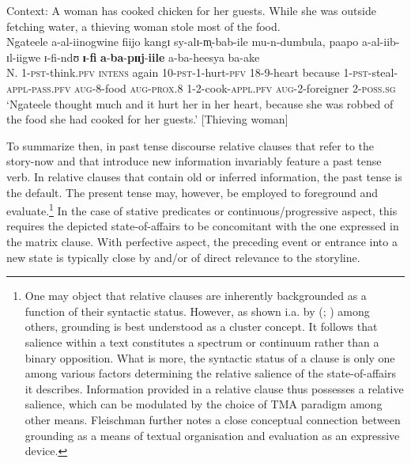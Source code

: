 \begin{exe}
\ex Context: A woman has cooked chicken for her guests. While she was outside fetching water, a thieving woman stole most of the food.\\
\gll Ngateele a-al-iinogwine fiijo kangɪ sy-alɪ-m̩-bab-ile mu-n-dumbula, paapo a-al-iib-ɪl-iigwe ɪ-fi-ndʊ \textbf{ɪ}-\textbf{fi} \textbf{a}-\textbf{ba}-\textbf{pɪɪj}-\textbf{iile} a-ba-heesya ba-ake\\
N. 1-\textsc{pst}-think.\textsc{pfv} \textsc{intens} again 10-\textsc{pst}-1-hurt-\textsc{pfv} 18-9-heart because 1-\textsc{pst}-steal-\textsc{appl}-\textsc{pass.pfv} \textsc{aug}-8-food \textsc{aug}-\textsc{prox.8} 1-2-cook-\textsc{appl.pfv} \textsc{aug}-2-foreigner 2-\textsc{poss.sg}\\
\glt \lq Ngateele thought much and it hurt her in her heart, because she was robbed of the food she had cooked for her guests.' [Thieving woman]
\end{exe}

To summarize then, in past tense  discourse relative clauses that refer to the story-now and that introduce new information invariably feature a past tense verb. In relative clauses that contain old or inferred information, the past tense is the default. The present tense may, however, be 
employed to foreground and evaluate.\footnote{One may object that relative clauses are inherently backgrounded as a function of their syntactic status. However, as shown i.a. by \citeauthor{FleischmanS1985} (\citeyear{FleischmanS1985}; \citeyear[ch. 6]{FleischmanS1990}) among others, grounding is best understood as a cluster concept. It follows that salience within a text constitutes a spectrum or continuum rather than a binary opposition. What is more, the syntactic status of a clause is only one among various factors determining the relative salience of the state-of-affairs it describes. Information provided in a relative clause thus possesses a relative salience, which can be modulated by the choice of TMA paradigm among other means. Fleischman further notes a close conceptual connection between grounding as a means of textual organisation and evaluation as an expressive device.} In the case of stative predicates or continuous/progressive aspect, this requires the depicted state-of-affairs to be concomitant with the one expressed in the matrix clause. With perfective aspect, the preceding event or entrance into a new state is typically close by and/or of direct relevance to the storyline.

